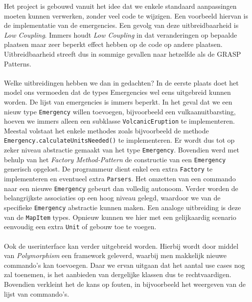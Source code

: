 \label{uitbreidbaarheid}
Het project is gebouwd vanuit het idee dat we enkele standaard aanpassingen moeten kunnen verwerken, zonder veel code te wijzigen. Een voorbeeld hiervan is de implementatie van de emergencies. Een gevolg van deze uitbreidbaarheid is \textit{Low Coupling}. Immers houdt \textit{Low Coupling} in dat veranderingen op bepaalde plaatsen maar zeer beperkt effect hebben op de code op andere plaatsen. Uitbreidbaarheid streeft dus in sommige gevallen naar hetzelfde als de GRASP Patterns.

\paragraph{}
Welke uitbreidingen hebben we dan in gedachten? In de eerste plaats doet het model ons vermoeden dat de types Emergencies wel eens uitgebreid kunnen worden. De lijst van emergencies is immers beperkt. In het geval dat we een nieuw type \texttt{Emergency} willen toevoegen, bijvoorbeeld een vulkaanuitbarsting, hoeven we immers alleen een subklasse \texttt{VolcanicEruption} te implementeren. Meestal volstaat het enkele methodes zoals bijvoorbeeld de methode \texttt{Emergency.calculateUnitsNeeded()} te implementeren. Er wordt dus tot op zeker niveau abstractie gemaakt van het type \texttt{Emergency}. Bovendien werd met behulp van het \textit{Factory Method-Pattern} de constructie van een \texttt{Emergency} generisch opgelost. De programmeur dient enkel een extra \texttt{Factory} te implementeren en eventueel extra \texttt{Parsers}. Het omzetten van een commando naar een nieuwe \texttt{Emergency} gebeurt dan volledig autonoom. Verder worden de belangrijkste associaties op een hoog niveau gelegd, waardoor we van de specifieke \texttt{Emergency} abstractie kunnen maken. Een analoge uitbreiding is deze van de \texttt{MapItem} types. Opnieuw kunnen we hier met een gelijkaardig scenario eenvoudig een extra \texttt{Unit} of gebouw toe te voegen.

\paragraph{}
Ook de userinterface kan verder uitgebreid worden. Hierbij wordt door middel van \textit{Polymorphism} een framework geleverd, waarbij men makkelijk nieuwe commando's kan toevoegen. Daar we ervan uitgaan dat het aantal use cases nog zal toenemen, is het aanbieden van dergelijke klassen dus te rechtvaardigen. Bovendien verkleint het de kans op fouten, in bijvoorbeeld het weergeven van de lijst van commando's.

